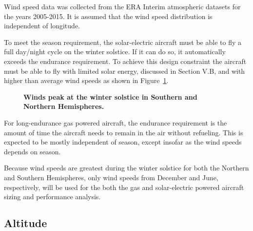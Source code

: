 Wind speed data was collected from the ERA Interim atmospheric datasets for the years 2005-2015.\cite{wind} 
It is assumed that the wind speed distribution is independent of longitude. 

To meet the season requirement, the solar-electric aircraft must be able to fly a full day/night cycle on the winter solstice.  
If it can do so, it automatically exceeds the endurance requirement. 
To achieve this design constraint the aircraft must be able to fly with limited solar energy, discussed in Section V.B, and with higher than average wind speeds as shown in Figure~\ref{f:windvsmonth}.  

\begin{figure}[h!]
 \begin{subfigmatrix}{2}%
 \end{subfigmatrix}
 \caption{\textbf{Winds peak at the winter solstice in Southern and Northern Hemispheres.\cite{wind}}}
 \label{f:windvsmonth}
\end{figure}

For long-endurance gas powered aircraft, the endurance requirement is the amount of time the aircraft needs to remain in the air without refueling.  
This is expected to be mostly independent of season, except insofar as the wind speeds depends on season. 

Because wind speeds are greatest during the winter solstice for both the Northern and Southern Hemispheres, only wind speeds from December and June, respectively, will be used for the both the gas and solar-electric powered aircraft sizing and performance analysis. 


\subsection{Altitude}

